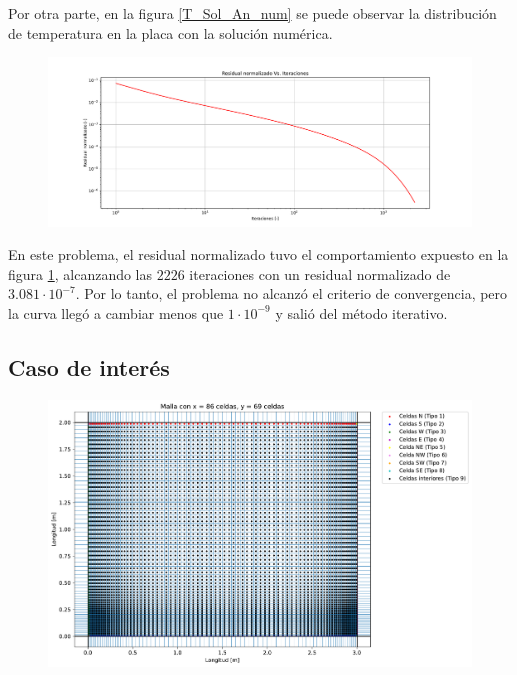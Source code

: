 \documentclass[article,latterpaper]{article}
\begin{document}
Por otra parte, en la figura \ref{T_Sol_An_num} se puede observar la distribución de temperatura en la placa con la solución numérica.

\begin{figure}[H]
    \centering
    \includegraphics[scale=0.2]{Caso_analitico/Residuales.pdf}
    \caption{ }
    \label{Res_An_num}
\end{figure}

En este problema, el residual normalizado tuvo el comportamiento expuesto en la figura \ref{Res_An_num}, alcanzando las $2226$ iteraciones con un residual normalizado de $3.081\cdot 10^{-7}$. Por lo tanto, el problema no alcanzó el criterio de convergencia, pero la curva llegó a cambiar menos que $1\cdot 10^{-9}$ y salió del método iterativo.

\subsection{Caso de interés}

\begin{figure}[H]
    \centering
    \includegraphics[scale=0.25]{Caso_interes/Malla.pdf}
    \caption{ }
    \label{Malla_int}
\end{figure}
\end{document}
